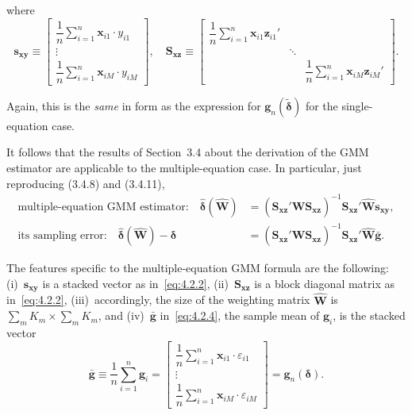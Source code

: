 where
\begin{equation}
\mathbf{s}_{\mathbf{x}\mathbf{y}}
\equiv \begin{bmatrix}
\dfrac{1}{n} \displaystyle\sum_{i=1}^{n} \mathbf{x}_{i1} \cdot y_{i1} \\[6pt]
\vdots \\[4pt]
\dfrac{1}{n} \displaystyle\sum_{i=1}^{n} \mathbf{x}_{iM} \cdot y_{iM}
\end{bmatrix}, \quad
\mathbf{S}_{\mathbf{x}\mathbf{z}}
\equiv \begin{bmatrix}
\dfrac{1}{n} \displaystyle\sum_{i=1}^{n} \mathbf{x}_{i1} \mathbf{z}_{i1}' & & \\
& \ddots & \\
& & \dfrac{1}{n} \displaystyle\sum_{i=1}^{n} \mathbf{x}_{iM} \mathbf{z}_{iM}'
\end{bmatrix}.
\label{eq:4.2.2}
\end{equation}

Again, this is the \textit{same} in form as the expression for
$\mathbf{g}_n(\tilde{\boldsymbol{\delta}})$ for the single-equation case.

It follows that the results of Section~3.4 about the derivation of the GMM estimator
are applicable to the multiple-equation case. In particular, just reproducing
(3.4.8) and (3.4.11),
\begin{align}
\text{multiple-equation GMM estimator:}\quad
\hat{\boldsymbol{\delta}}(\hat{\mathbf{W}})
&= (\mathbf{S}_{\mathbf{x}\mathbf{z}}' \hat{\mathbf{W}} \mathbf{S}_{\mathbf{x}\mathbf{z}})^{-1}
\mathbf{S}_{\mathbf{x}\mathbf{z}}' \hat{\mathbf{W}} \mathbf{s}_{\mathbf{x}\mathbf{y}},
\label{eq:4.2.3} \\[4pt]
\text{its sampling error:}\quad
\hat{\boldsymbol{\delta}}(\hat{\mathbf{W}}) - \boldsymbol{\delta}
&= (\mathbf{S}_{\mathbf{x}\mathbf{z}}' \hat{\mathbf{W}} \mathbf{S}_{\mathbf{x}\mathbf{z}})^{-1}
\mathbf{S}_{\mathbf{x}\mathbf{z}}' \hat{\mathbf{W}} \bar{\mathbf{g}}.
\label{eq:4.2.4}
\end{align}

The features specific to the multiple-equation GMM formula are the following:
(i)~$\mathbf{s}_{\mathbf{x}\mathbf{y}}$ is a stacked vector as in~\eqref{eq:4.2.2},
(ii)~$\mathbf{S}_{\mathbf{x}\mathbf{z}}$ is a block diagonal matrix as in~\eqref{eq:4.2.2},
(iii)~accordingly, the size of the weighting matrix $\hat{\mathbf{W}}$ is
$\sum_m K_m \times \sum_m K_m$,
and (iv)~$\bar{\mathbf{g}}$ in~\eqref{eq:4.2.4}, the sample mean of $\mathbf{g}_i$,
is the stacked vector
\begin{equation}
\bar{\mathbf{g}} \equiv \frac{1}{n} \sum_{i=1}^{n} \mathbf{g}_i
= \begin{bmatrix}
\dfrac{1}{n} \displaystyle\sum_{i=1}^{n} \mathbf{x}_{i1} \cdot \varepsilon_{i1} \\[6pt]
\vdots \\[4pt]
\dfrac{1}{n} \displaystyle\sum_{i=1}^{n} \mathbf{x}_{iM} \cdot \varepsilon_{iM}
\end{bmatrix}
= \mathbf{g}_n(\boldsymbol{\delta}).
\label{eq:4.2.5}
\end{equation}

